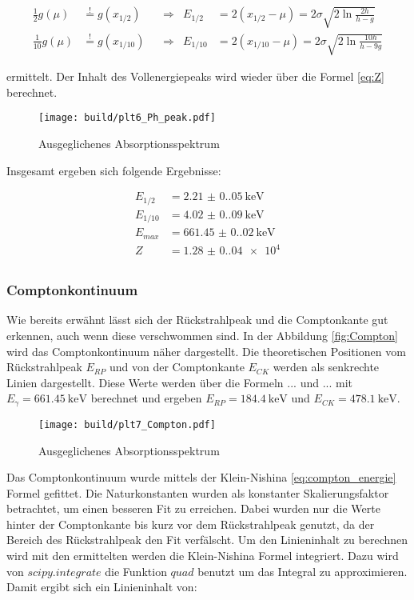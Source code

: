 \begin{align*}
	\frac{1}{2}g(\mu)  & \stackrel{!}{=}g(x_{1/2})  &  & \Rightarrow & E_{1/2}  & =2(x_{1/2}-\mu)=2\sigma \sqrt{2 \ln{\frac{2h}{h-g}}}    \\
	\frac{1}{10}g(\mu) & \stackrel{!}{=}g(x_{1/10}) &  & \Rightarrow & E_{1/10} & =2(x_{1/10}-\mu)=2\sigma \sqrt{2 \ln{\frac{10h}{h-9g}}}
\end{align*}

ermittelt. Der Inhalt des Vollenergiepeaks wird wieder über die Formel
\eqref{eq:Z} berechnet.

\begin{figure}[H]
	\centering
	\texttt{[image: build/plt6\_Ph\_peak.pdf]}
	\caption{Ausgeglichenes Absorptionsspektrum}
	\label{fig:Cs_peak}
\end{figure}

Insgesamt ergeben sich folgende Ergebnisse:

\begin{align*}
	E_{1/2}  & =\qty{2.21(0.05)}{\kilo\eV}   \\
	E_{1/10} & =\qty{4.02(0.09)}{\kilo\eV}   \\
	E_{max}  & =\qty{661.45(0.02)}{\kilo\eV} \\
	Z        & =\num{1.28(0.04)e4}           \\
\end{align*}

\subsubsection{Comptonkontinuum}
Wie bereits erwähnt lässt sich der Rückstrahlpeak und die Comptonkante gut
erkennen, auch wenn diese verschwommen sind. In der Abbildung
\eqref{fig:Compton} wird das Comptonkontinuum näher dargestellt. Die
theoretischen Positionen vom Rückstrahlpeak $E_{RP}$ und von der Comptonkante
$E_{CK}$ werden als senkrechte Linien dargestellt. Diese Werte werden über die
Formeln ... und ... mit $E_{\gamma}=\qty{661.45}{\kilo\eV}$ berechnet und
ergeben $E_{RP}=\qty{184.4}{\kilo\eV}$ und $E_{CK}=\qty{478.1}{\kilo\eV}$.

\begin{figure}[H]
	\centering
	\texttt{[image: build/plt7\_Compton.pdf]}
	\caption{Ausgeglichenes Absorptionsspektrum}
	\label{fig:Compton}
\end{figure}

Das Comptonkontinuum wurde mittels der Klein-Nishina \eqref{eq:compton_energie} Formel gefittet.
Die Naturkonstanten wurden als konstanter Skalierungsfaktor betrachtet, um einen besseren Fit zu erreichen. 
Dabei wurden nur die Werte hinter der Comptonkante bis kurz vor dem Rückstrahlpeak genutzt, 
da der Bereich des Rückstrahlpeak den Fit verfälscht. 
Um den Linieninhalt zu berechnen wird mit den ermittelten werden die Klein-Nishina Formel integriert. 
Dazu wird von $scipy.integrate$ \cite{scipy} die Funktion $quad$ benutzt um das Integral zu approximieren. 
Damit ergibt sich ein Linieninhalt von:


